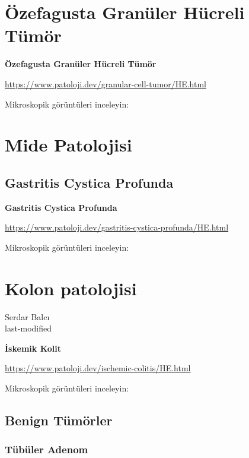 \documentclass[
  letterpaper,
  DIV=11,
  numbers=noendperiod]{scrreprt}
\begin{document}
\hypertarget{uxf6zefagusta-granuxfcler-huxfccreli-tuxfcmuxf6r}{%
\chapter{Özefagusta Granüler Hücreli
Tümör}\label{uxf6zefagusta-granuxfcler-huxfccreli-tuxfcmuxf6r}}

\textbf{Özefagusta Granüler Hücreli Tümör}

\url{https://www.patoloji.dev/granular-cell-tumor/HE.html}

Mikroskopik görüntüleri inceleyin:

\hypertarget{mide-patolojisi}{%
\chapter{Mide Patolojisi}\label{mide-patolojisi}}

\hypertarget{gastritis-cystica-profunda}{%
\section{Gastritis Cystica Profunda}\label{gastritis-cystica-profunda}}

\textbf{Gastritis Cystica Profunda}

\url{https://www.patoloji.dev/gastritis-cystica-profunda/HE.html}

Mikroskopik görüntüleri inceleyin:

\hypertarget{kolon-patolojisi}{%
\chapter{Kolon patolojisi}\label{kolon-patolojisi}}

Serdar Balcı\\
last-modified

\hfill\break

\textbf{İskemik Kolit}

\url{https://www.patoloji.dev/ischemic-colitis/HE.html}

Mikroskopik görüntüleri inceleyin:

\hypertarget{benign-tuxfcmuxf6rler-1}{%
\section{Benign Tümörler}\label{benign-tuxfcmuxf6rler-1}}

\hypertarget{tuxfcbuxfcler-adenom-1}{%
\subsection{Tübüler Adenom}\label{tuxfcbuxfcler-adenom-1}}
\end{document}
